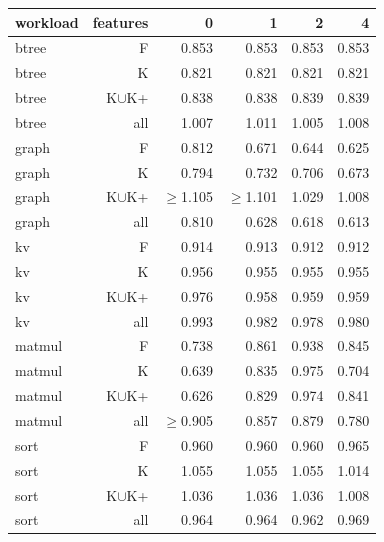 \begin{tabular}{lrrrrr}
\toprule
workload & features & 0 & 1 & 2 & 4 \\
\midrule
btree & F & 0.853 & 0.853 & 0.853 & 0.853 \\
btree & K & 0.821 & 0.821 & 0.821 & 0.821 \\
btree & K$\cup$K{+} & 0.838 & 0.838 & 0.839 & 0.839 \\
btree & all & 1.007 & 1.011 & 1.005 & 1.008 \\
graph & F & 0.812 & 0.671 & 0.644 & 0.625 \\
graph & K & 0.794 & 0.732 & 0.706 & 0.673 \\
graph & K$\cup$K{+} & $\geq$1.105 & $\geq$1.101 & 1.029 & 1.008 \\
graph & all & 0.810 & 0.628 & 0.618 & 0.613 \\
kv & F & 0.914 & 0.913 & 0.912 & 0.912 \\
kv & K & 0.956 & 0.955 & 0.955 & 0.955 \\
kv & K$\cup$K{+} & 0.976 & 0.958 & 0.959 & 0.959 \\
kv & all & 0.993 & 0.982 & 0.978 & 0.980 \\
matmul & F & 0.738 & 0.861 & 0.938 & 0.845 \\
matmul & K & 0.639 & 0.835 & 0.975 & 0.704 \\
matmul & K$\cup$K{+} & 0.626 & 0.829 & 0.974 & 0.841 \\
matmul & all & $\geq$0.905 & 0.857 & 0.879 & 0.780 \\
sort & F & 0.960 & 0.960 & 0.960 & 0.965 \\
sort & K & 1.055 & 1.055 & 1.055 & 1.014 \\
sort & K$\cup$K{+} & 1.036 & 1.036 & 1.036 & 1.008 \\
sort & all & 0.964 & 0.964 & 0.962 & 0.969 \\
\bottomrule
\end{tabular}
